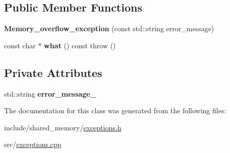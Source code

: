 \subsection*{Public Member Functions}
\begin{DoxyCompactItemize}
\item 
\mbox{\label{classshared__memory_1_1Memory__overflow__exception_aed67eae5c2822873debe5eb8a7427c0b}} 
{\bfseries Memory\+\_\+overflow\+\_\+exception} (const std\+::string error\+\_\+message)
\item 
\mbox{\label{classshared__memory_1_1Memory__overflow__exception_a61324293a514cc62610bdc2587f9e6bf}} 
const char $\ast$ {\bfseries what} () const  throw ()
\end{DoxyCompactItemize}
\subsection*{Private Attributes}
\begin{DoxyCompactItemize}
\item 
\mbox{\label{classshared__memory_1_1Memory__overflow__exception_ad63afdde056259c8fb0bd3212031783d}} 
std\+::string {\bfseries error\+\_\+message\+\_\+}
\end{DoxyCompactItemize}


The documentation for this class was generated from the following files\+:\begin{DoxyCompactItemize}
\item 
include/shared\+\_\+memory/\hyperlink{exceptions_8h}{exceptions.\+h}\item 
src/\hyperlink{exceptions_8cpp}{exceptions.\+cpp}\end{DoxyCompactItemize}
